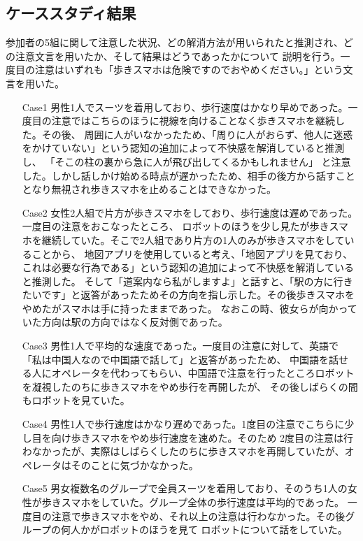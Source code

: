 \documentclass{kuisthesis}
\begin{document}
\subsection{ケーススタディ結果}
参加者の5組に関して注意した状況、どの解消方法が用いられたと推測され、どの注意文言を用いたか、そして結果はどうであったかについて
説明を行う。一度目の注意はいずれも「歩きスマホは危険ですのでおやめください。」という文言を用いた。
\begin{enumerate}
  \item[Case1] 男性1人でスーツを着用しており、歩行速度はかなり早めであった。一度目の注意ではこちらのほうに視線を向けることなく歩きスマホを継続した。その後、
  周囲に人がいなかったため、「周りに人がおらず、他人に迷惑をかけていない」という認知の追加によって不快感を解消していると推測し、
  「そこの柱の裏から急に人が飛び出してくるかもしれません」
  と注意した。しかし話しかけ始める時点が遅かったため、相手の後方から話すこととなり無視され歩きスマホを止めることはできなかった。
  \item[Case2] 女性2人組で片方が歩きスマホをしており、歩行速度は遅めであった。一度目の注意をおこなったところ、
  ロボットのほうを少し見たが歩きスマホを継続していた。そこで2人組であり片方の1人のみが歩きスマホをしていることから、
  地図アプリを使用していると考え、「地図アプリを見ており、これは必要な行為である」という認知の追加によって不快感を解消していると推測した。
  そして「道案内なら私がしますよ」と話すと、「駅の方に行きたいです」と返答があったためその方向を指し示した。その後歩きスマホをやめたがスマホは手に持ったままであった。
  なおこの時、彼女らが向かっていた方向は駅の方向ではなく反対側であった。
  \item[Case3] 男性1人で平均的な速度であった。一度目の注意に対して、英語で「私は中国人なので中国語で話して」と返答があったため、
  中国語を話せる人にオペレータを代わってもらい、中国語で注意を行ったところロボットを凝視したのちに歩きスマホをやめ歩行を再開したが、
  その後しばらくの間もロボットを見ていた。
  \item[Case4] 男性1人で歩行速度はかなり遅めであった。1度目の注意でこちらに少し目を向け歩きスマホをやめ歩行速度を速めた。そのため
  2度目の注意は行わなかったが、実際はしばらくしたのちに歩きスマホを再開していたが、オペレータはそのことに気づかなかった。
  \item[Case5] 男女複数名のグループで全員スーツを着用しており、そのうち1人の女性が歩きスマホをしていた。グループ全体の歩行速度は平均的であった。
  一度目の注意で歩きスマホをやめ、それ以上の注意は行わなかった。その後グループの何人かがロボットのほうを見て
  ロボットについて話をしていた。
\end{enumerate}
\end{document}
